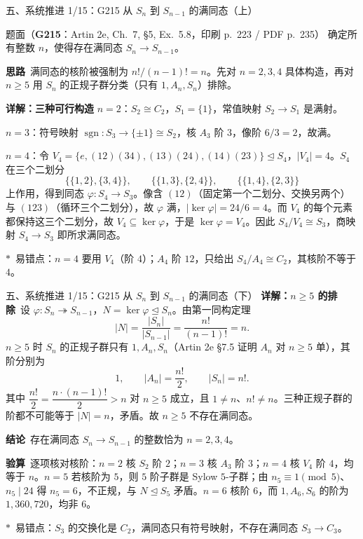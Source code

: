 \documentclass[aspectratio=169,10pt,fontset=none]{ctexbeamer}
\newcommand{\ex}[1]{\textcolor{accent}{\footnotesize\bfseries #1}}
\newcommand{\key}[1]{\textcolor{ink}{\bfseries #1}}
\newcommand{\starpt}{\textcolor{accent}{\bfseries$\ast$}}
\begin{document}
\begin{frame}[t]{五、系统推进 1/15：G215 从 $S_n$ 到 $S_{n-1}$ 的满同态（上）}
\label{ex:G215}
\scriptsize
\begin{block}{\footnotesize 题面（\ex{G215}：Artin 2e, Ch.~7, \S5, Ex.~5.8，印刷 p.~223 / PDF p.~235）}
确定所有整数 $n$，使得存在满同态 $S_n\to S_{n-1}$。
\end{block}
\vspace{-0.6mm}
\key{思路}\ 满同态的核阶被强制为 $n!/(n-1)!=n$。先对 $n=2,3,4$ 具体构造，再对 $n\ge5$ 用 $S_n$ 的正规子群分类（只有 $1,A_n,S_n$）排除。

\key{详解：三种可行构造}
$n=2$：$S_2\cong C_2$，$S_1=\{1\}$，常值映射 $S_2\to S_1$ 是满射。

$n=3$：符号映射 $\operatorname{sgn}:S_3\to\{\pm1\}\cong S_2$，核 $A_3$ 阶 $3$，像阶 $6/3=2$，故满。

$n=4$：令 $V_4=\{e,(12)(34),(13)(24),(14)(23)\}\trianglelefteq S_4$，$|V_4|=4$。$S_4$ 在三个二划分
\[
\{\{1,2\},\{3,4\}\},\qquad \{\{1,3\},\{2,4\}\},\qquad \{\{1,4\},\{2,3\}\}
\]
上作用，得到同态 $\varphi:S_4\to S_3$。像含 $(12)$（固定第一个二划分、交换另两个）与 $(123)$（循环三个二划分），故 $\varphi$ 满，$|\ker\varphi|=24/6=4$。而 $V_4$ 的每个元素都保持这三个二划分，故 $V_4\subseteq\ker\varphi$，于是 $\ker\varphi=V_4$。因此 $S_4/V_4\cong S_3$，商映射 $S_4\to S_3$ 即所求满同态。

\starpt\ 易错点：$n=4$ 要用 $V_4$（阶 $4$）；$A_4$ 阶 $12$，只给出 $S_4/A_4\cong C_2$，其核阶不等于 $4$。
\end{frame}

\begin{frame}[t]{五、系统推进 1/15：G215 从 $S_n$ 到 $S_{n-1}$ 的满同态（下）}
\scriptsize
\key{详解：$n\ge5$ 的排除}\ 设 $\varphi:S_n\twoheadrightarrow S_{n-1}$，$N=\ker\varphi\trianglelefteq S_n$。由第一同构定理
\[
|N|=\frac{|S_n|}{|S_{n-1}|}=\frac{n!}{(n-1)!}=n.
\]
$n\ge5$ 时 $S_n$ 的正规子群只有 $1,A_n,S_n$（Artin 2e \S7.5 证明 $A_n$ 对 $n\ge5$ 单），其阶分别为
\[
1,\qquad |A_n|=\frac{n!}{2},\qquad |S_n|=n!.
\]
其中 $\dfrac{n!}{2}=\dfrac{n\cdot(n-1)!}{2}>n$ 对 $n\ge5$ 成立，且 $1\ne n$、$n!\ne n$。三种正规子群的阶都不可能等于 $|N|=n$，矛盾。故 $n\ge5$ 不存在满同态。

\key{结论}\ 存在满同态 $S_n\to S_{n-1}$ 的整数恰为 $n=2,3,4$。

\key{验算}\ 逐项核对核阶：$n=2$ 核 $S_2$ 阶 $2$；$n=3$ 核 $A_3$ 阶 $3$；$n=4$ 核 $V_4$ 阶 $4$，均等于 $n$。$n=5$ 若核阶为 $5$，则 $5$ 阶子群是 Sylow $5$-子群；由 $n_5\equiv1\pmod5$、$n_5\mid24$ 得 $n_5=6$，不正规，与 $N\trianglelefteq S_5$ 矛盾。$n=6$ 核阶 $6$，而 $1,A_6,S_6$ 的阶为 $1,360,720$，均非 $6$。

\starpt\ 易错点：$S_3$ 的交换化是 $C_2$，满同态只有符号映射，不存在满同态 $S_3\to C_3$。
\end{frame}
\end{document}
